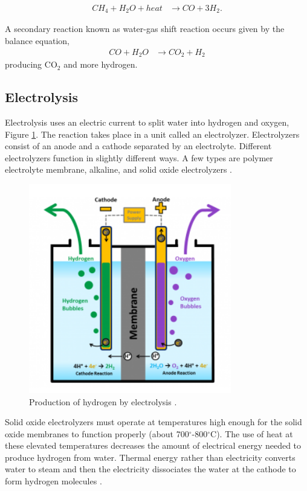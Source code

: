 \documentclass{anstrans}
\begin{document}
\begin{align}
CH_4 + H_2O + heat & \rightarrow CO + 3H_2 .
\label{eq:1}
\end{align}

A secondary reaction known as water-gas shift reaction occurs given by the balance equation,
\begin{align}
CO + H_2O & \rightarrow CO_2 + H_2
\label{eq:2}
\end{align}
producing CO$_2$ and more hydrogen.

\subsection{Electrolysis}

Electrolysis uses an electric current to split water into hydrogen and oxygen, Figure \ref{fig:electro}. The reaction takes place in a unit called an electrolyzer. Electrolyzers consist of an anode and a cathode separated by an electrolyte. Different electrolyzers function in slightly different ways. A few types are polymer electrolyte membrane, alkaline, and solid oxide electrolyzers \cite{noauthor_hydrogen_nodate}.

\begin{figure}[]
	\centering
	\includegraphics[width=0.55\linewidth]{figures/electrolysis.png}
	\hfill
	\caption{Production of hydrogen by electrolysis \cite{noauthor_hydrogen_nodate}.}
	\label{fig:electro}
\end{figure}

Solid oxide electrolyzers must operate at temperatures high enough for the solid oxide membranes to function properly (about 700$^{\circ}$-800$^{\circ}$C). The use of heat at these elevated temperatures decreases the amount of electrical energy needed to produce hydrogen from water.
Thermal energy rather than electricity converts water to steam and then the electricity dissociates the water at the cathode to form hydrogen molecules \cite{xu_introduction_2017}.
\end{document}
